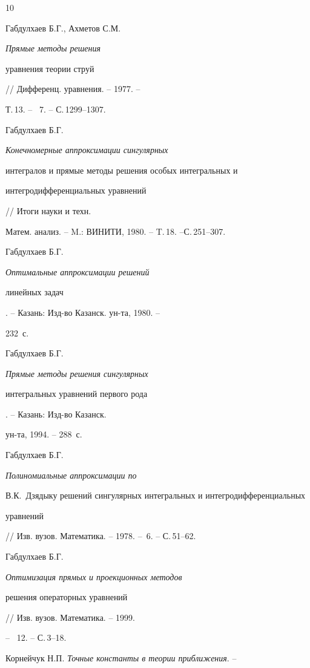 \begin{thebibliography}{10}





 Габдулхаев Б.Г., Ахметов С.М. {\em Прямые методы решения


уравнения теории струй} // Дифференц. уравнения. -- 1977. --


Т.\,13. -- \No\, 7. -- С.\,1299--1307.





 Габдулхаев Б.Г. {\em Конечномерные аппроксимации сингулярных


интегралов и прямые методы решения особых интегральных и


интегродифференциальных уравнений} // Итоги науки и техн.


Матем. анализ. -- M.: ВИНИТИ, 1980. -- T.\,18. --С.\,251--307.





 Габдулхаев Б.Г. {\em Оптимальные аппроксимации решений


линейных задач}. -- Казань: Изд-во Казанск. ун-та, 1980. --


232~с.





 Габдулхаев Б.Г. {\em Прямые методы решения сингулярных


интегральных уравнений первого рода}. -- Казань: Изд-во Казанск.


ун-та, 1994. -- 288~с.





 Габдулхаев Б.Г. {\em Полиномиальные аппроксимации по


В.К.~Дзядыку решений сингулярных интегральных и интегродифференциальных


уравнений} // Изв. вузов. Математика. -- 1978. -- \No\,6. -- С.\,51--62.





 Габдулхаев Б.Г. {\em Оптимизация прямых и проекционных методов


решения операторных уравнений} // Изв. вузов. Математика. -- 1999.


-- \No\, 12. -- С.\,3--18.





 Корнейчук Н.П. {\em Точные константы в теории приближения}. --



\end{thebibliography}
